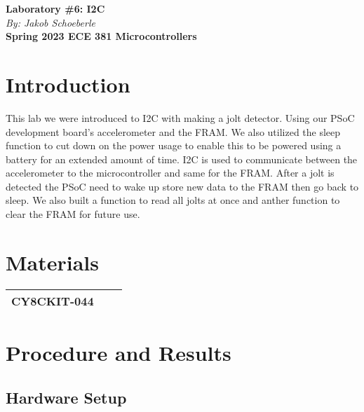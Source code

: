 \documentclass{article}
\begin{document}
\begin{titlepage}
  \begin{center}
     \Large\textbf{Laboratory \#6: I2C}\\
     \vspace{4mm}
     \large\textit{By: Jakob Schoeberle}\\
     \vspace{4mm}
     \large\textbf{Spring 2023 ECE 381 Microcontrollers}\\
  \end{center}
\end{titlepage}

\section*{Introduction}

This lab we were introduced to I2C with making a jolt detector. Using our PSoC development board’s accelerometer and the FRAM. We also utilized the sleep function to cut down on the power usage to enable this to be powered using a battery for an extended amount of time. I2C is used to communicate between the accelerometer to the microcontroller and same for the FRAM. After a jolt is detected the PSoC need to wake up store new data to the FRAM then go back to sleep. We also built a function to read all jolts at once and anther function to clear the FRAM for future use.

\section*{Materials}

\begin{tabularx}{0.9\textwidth} { 
  | >{\raggedright\arraybackslash}X 
  | >{\centering\arraybackslash}X 
  | >{\raggedleft\arraybackslash}X | }
 \hline
 CY8CKIT-044 & 1\\
 \hline
\end{tabularx}

\section*{Procedure and Results}
  \subsection*{Hardware Setup}
    
\end{document}
